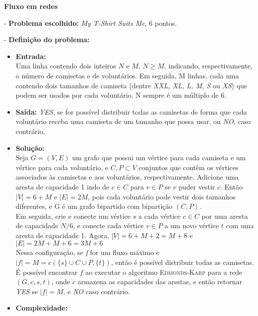\documentclass[
    12pt,
    a4paper,
    brazil,
    english
]{article}
\begin{document}

\textbf{\large Fluxo em redes}
\vspace{0.5cm}

- \textbf{Problema escolhido:} \textit{My T-Shirt Suits Me}, 6 pontos.

\vspace{0.25cm}

- \textbf{Definição do problema:}
\begin{itemize}
    \item \textbf{Entrada:} \\
    Uma linha contendo dois inteiros $N$ e $M$, $N \ge M$, indicando, respectivamente, o número de 
    camisetas e de voluntários. Em seguida, M linhas, cada uma contendo dois tamanhos de camiseta (dentre \textit{XXL, XL, L, M, S} ou \textit{XS}) que podem ser usados por cada voluntário. N sempre é um múltiplo de 6.\\
    \item \textbf{Saída:} \textit{YES}, se for possível distribuir todas as camisetas de forma que cada voluntário receba uma camiseta de um tamanho que possa usar, ou \textit{NO}, caso contrário.
    \item \textbf{Solução:} \\
    Seja $G = (V, E)$ um grafo que possui um vértice para cada camiseta e um vértice para cada voluntário, e $C, P \subset V$ conjuntos que contêm os vértices associados às camisetas e aos voluntários, respectivamente.
    Adicione uma aresta de capacidade 1 indo de $c \in C$ para $v \in P$ se $v$ puder vestir $c$.
    Então $|V| = 6 + M$ e $|E| = 2M$, pois cada voluntário pode vestir dois tamanhos diferentes, e G é um grafo bipartido com bipartição $(C, P)$. \\
    Em seguida, crie e conecte um vértice $s$ a cada vértice $c \in C$ por uma aresta de capacidade $N/6$, e conecte cada vértice $v \in P$ a um novo vértice $t$ com uma aresta de capacidade 1. 
    Agora, $|V| = 6 + M + 2 = M + 8$ e $|E| = 2M + M + 6 = 3M + 6$\\
    Nessa configuração, se \textit{f} for um fluxo máximo e \mbox{$|f| = M = c(\{s\} \cup C \cup P, \{t\})$}, então é possível distribuir todas as camisetas.
    É possível encontrar $f$ ao executar o algoritmo \textsc{Edmonds-Karp} para a rede $(G, c, s, t)$, onde $c$ armazena as capacidades das arestas, e então retornar \textit{YES} se $|f| = M$, e \textit{NO} caso contrário. \\
    \item \textbf{Complexidade:} 

\end{itemize}
\end{document}
